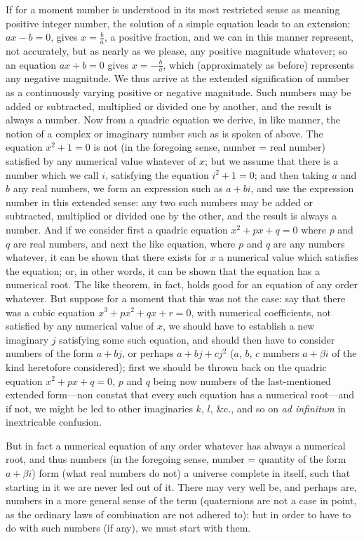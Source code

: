 \documentclass[11pt,a4paper]{article}
\begin{document}
If for a moment number is understood in its most restricted sense as meaning positive integer number, the solution of a simple equation leads to an extension; $ax - b = 0$, gives $x = \frac{b}{a}$, a positive fraction, and we can in this manner represent, not accurately, but as nearly as we please, any positive magnitude whatever; so an equation $ax + b = 0$ gives $x = -\frac{b}{a}$, which (approximately as before) represents any negative magnitude. We thus arrive at the extended signification of number as a continuously varying positive or negative magnitude. Such numbers may be added or subtracted, multiplied or divided one by another, and the result is always a number. Now from a quadric equation we derive, in like manner, the notion of a complex or imaginary number such as is spoken of above. The equation $x^{2} + 1 = 0$ is not (in the foregoing sense, number = real number) satisfied by any numerical value whatever of $x$; but we assume that there is a number which we call $i$, satisfying the equation $i^{2} + 1 = 0$; and then taking $a$ and $b$ any real numbers, we form an expression such as $a + bi$, and use the expression number in this extended sense: any two such numbers may be added or subtracted, multiplied or divided one by the other, and the result is always a number. And if we consider first a quadric equation $x^{2} + px + q = 0$ where $p$ and $q$ are real numbers, and next the like equation, where $p$ and $q$ are any numbers whatever, it can be shown that there exists for $x$ a numerical value which satisfies the equation; or, in other words, it can be shown that the equation has a numerical root. The like theorem, in fact, holds good for an equation of any order whatever. But suppose for a moment that this was not the case: say that there was a cubic equation $x^{3} + px^{2} + qx + r = 0$, with numerical coefficients, not satisfied by any numerical value of $x$, we should have to establish a new imaginary $j$ satisfying some such equation, and should then have to consider numbers of the form $a + bj$, or perhaps $a + bj + cj^{2}$ ($a$, $b$, $c$ numbers $a + \beta i$ of the kind heretofore considered); first we should be thrown back on the quadric equation $x^{2} + px + q = 0$, $p$ and $q$ being now numbers of the last-mentioned extended form---non constat that every such equation has a numerical root---and if not, we might be led to other imaginaries $k$, $l$, \&c., and so on \textit{ad infinitum} in inextricable confusion.

But in fact a numerical equation of any order whatever has always a numerical root, and thus numbers (in the foregoing sense, number = quantity of the form $a + \beta i$) form (what real numbers do not) a universe complete in itself, such that starting in it we are never led out of it. There may very well be, and perhaps are, numbers in a more general sense of the term (quaternions are not a case in point, as the ordinary laws of combination are not adhered to): but in order to have to do with such numbers (if any), we must start with them.
\end{document}
